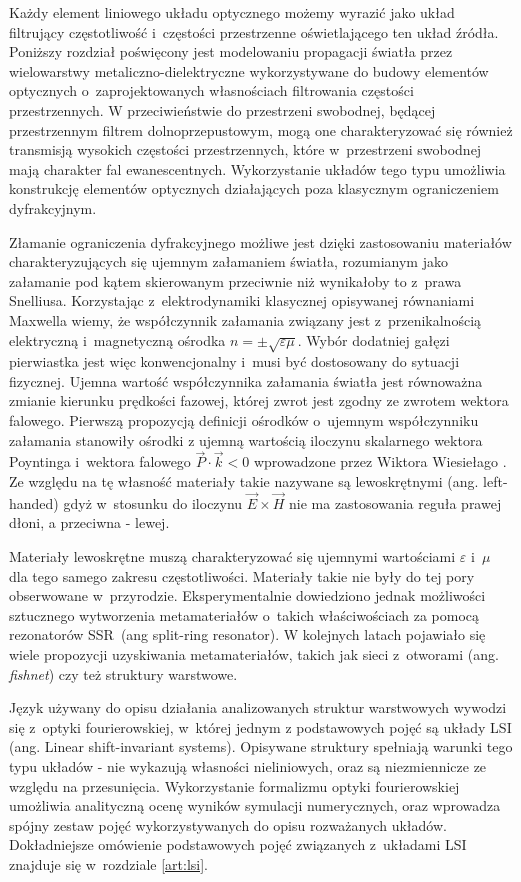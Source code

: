 Każdy element liniowego układu optycznego możemy wyrazić jako układ filtrujący częstotliwość i~częstości przestrzenne oświetlającego ten układ źródła. Poniższy rozdział poświęcony jest modelowaniu propagacji światła przez wielowarstwy metaliczno-dielektryczne wykorzystywane do  budowy elementów optycznych o~zaprojektowanych własnościach filtrowania częstości przestrzennych. W przeciwieństwie do przestrzeni swobodnej, będącej przestrzennym filtrem dolnoprzepustowym, mogą one charakteryzować się również transmisją wysokich częstości przestrzennych, które w~przestrzeni swobodnej mają charakter fal ewanescentnych. Wykorzystanie układów tego typu umożliwia konstrukcję elementów optycznych działających poza klasycznym ograniczeniem dyfrakcyjnym.

Złamanie ograniczenia dyfrakcyjnego możliwe jest dzięki zastosowaniu materiałów charakteryzujących się ujemnym załamaniem światła, rozumianym jako załamanie pod kątem skierowanym przeciwnie niż wynikałoby to z~prawa Snelliusa. Korzystając z~elektrodynamiki klasycznej opisywanej równaniami \nohyphens{Maxwella} wiemy, że współczynnik załamania związany jest z~przenikalnością elektryczną i~magnetyczną ośrodka $n = \pm \sqrt{ \varepsilon \mu}$. Wybór dodatniej gałęzi pierwiastka jest więc konwencjonalny i~musi być dostosowany do sytuacji fizycznej. Ujemna wartość współczynnika załamania światła jest równoważna zmianie kierunku prędkości fazowej, której zwrot jest zgodny ze zwrotem wektora falowego. Pierwszą propozycją definicji ośrodków o~ujemnym współczynniku załamania stanowiły ośrodki z ujemną wartością iloczynu skalarnego wektora Poyntinga i~wektora falowego $\vec{P} \cdot \vec{k} < 0$ wprowadzone przez Wiktora Wiesiełago \cite{veselago1968electrodynamics}. Ze względu na tę własność materiały takie nazywane są lewoskrętnymi (ang. left-handed) gdyż w~stosunku do iloczynu $\vec{E} \times \vec{H}$ nie ma zastosowania reguła prawej dłoni, a przeciwna - lewej.

Materiały lewoskrętne muszą charakteryzować się ujemnymi wartościami $\varepsilon$ i~$\mu$ dla tego samego zakresu częstotliwości. Materiały takie nie były do tej pory obserwowane w~przyrodzie. Eksperymentalnie dowiedziono jednak możliwości sztucznego wytworzenia metamateriałów o~takich właściwościach\cite{PhysRevLett.84.4184} za pomocą rezonatorów SSR~(ang split-ring resonator). W kolejnych latach pojawiało się wiele propozycji uzyskiwania metamateriałów, takich jak sieci z~otworami (ang. \textit{fishnet}) czy też struktury warstwowe.

Język używany do opisu działania analizowanych struktur warstwowych wywodzi się z~optyki fourierowskiej, w~której jednym z podstawowych pojęć są układy LSI (ang. Linear shift-invariant systems). Opisywane struktury spełniają warunki tego typu układów - nie wykazują własności nieliniowych, oraz są niezmiennicze ze względu na przesunięcia. Wykorzystanie formalizmu optyki fourierowskiej umożliwia analityczną ocenę wyników symulacji numerycznych, oraz wprowadza spójny zestaw pojęć wykorzystywanych do opisu rozważanych układów. Dokładniejsze omówienie podstawowych pojęć związanych z~układami LSI znajduje się w~rozdziale \ref{art:lsi}.


